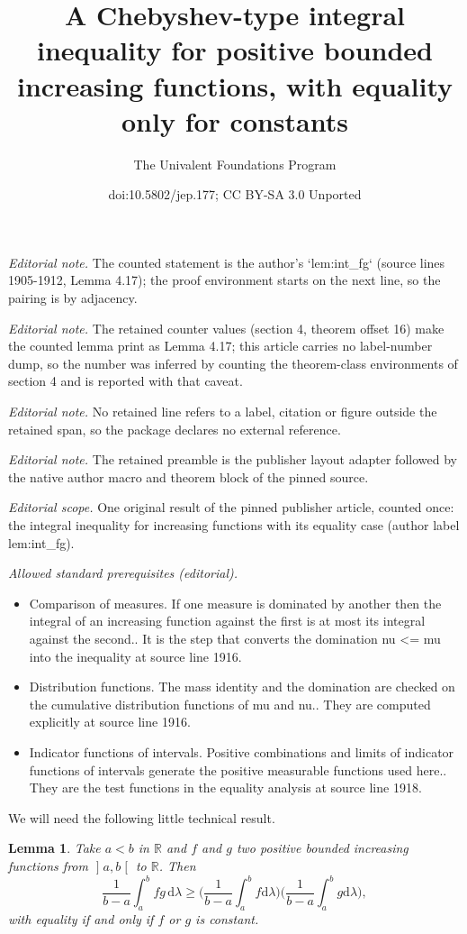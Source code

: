 \documentclass[10pt,a4paper]{article}
\title{A Chebyshev-type integral inequality for positive bounded increasing functions, with equality only for constants}
\author{The Univalent Foundations Program}
\date{doi:10.5802/jep.177; CC BY-SA 3.0 Unported}
\theoremstyle{plain}
\newtheorem{lem}[them]{Lemma}
\theoremstyle{definition}
\newcommand{\dd}{\mathrm{d}}
\newcommand{\la}{\lambda}
\newcommand{\R}{\mathbb{R}}
\newcommand{\op}{\mathopen}
\newcommand{\clo}{\mathclose}
\begin{document}
\maketitle
\setcounter{section}{4}
\setcounter{them}{16}
\noindent\textit{Editorial note.} The counted statement is the author's `lem:int\_fg` (source lines 1905-1912, Lemma 4.17); the proof environment starts on the next line, so the pairing is by adjacency.\par\medskip
\noindent\textit{Editorial note.} The retained counter values (section 4, theorem offset 16) make the counted lemma print as Lemma 4.17; this article carries no label-number dump, so the number was inferred by counting the theorem-class environments of section 4 and is reported with that caveat.\par\medskip
\noindent\textit{Editorial note.} No retained line refers to a label, citation or figure outside the retained span, so the package declares no external reference.\par\medskip
\noindent\textit{Editorial note.} The retained preamble is the publisher layout adapter followed by the native author macro and theorem block of the pinned source.\par\medskip
\noindent\textit{Editorial scope.} One original result of the pinned publisher article, counted once: the integral inequality for increasing functions with its equality case (author label lem:int\_fg).\par\medskip
\noindent\textit{Allowed standard prerequisites (editorial).}\begin{itemize}
\item Comparison of measures. If one measure is dominated by another then the integral of an increasing function against the first is at most its integral against the second.. It is the step that converts the domination nu <= mu into the inequality at source line 1916.
\item Distribution functions. The mass identity and the domination are checked on the cumulative distribution functions of mu and nu.. They are computed explicitly at source line 1916.
\item Indicator functions of intervals. Positive combinations and limits of indicator functions of intervals generate the positive measurable functions used here.. They are the test functions in the equality analysis at source line 1918.
\end{itemize}\medskip
We will need the following little technical result.

\begin{lem}\label{lem:int_fg}Take $a<b$ in $\R$ and $f$ and $g$ two positive bounded increasing functions from $\op]a,b\clo[$ to $\R$. Then
\[
\frac1{b-a}\int_a^b fg\,\dd\la\geq \biggl(\frac1{b-a}\int_a^b f\dd\la\biggr)\biggl(\frac1{b-a}\int_a^b g\dd\la\biggr),
\]
with equality if and only if $f$ or $g$ is constant.
\end{lem}
\end{document}
